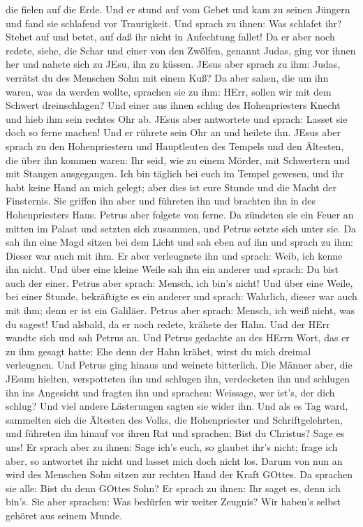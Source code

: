 die fielen auf die Erde.  Und er stund auf vom Gebet und
kam zu seinen Jüngern und fand sie schlafend vor Traurigkeit.
 Und sprach zu ihnen: Was schlafet ihr? Stehet auf und
betet, auf daß ihr nicht in Anfechtung fallet!  Da er aber
noch redete, siehe, die Schar und einer von den Zwölfen, genannt Judas,
ging vor ihnen her und nahete sich zu JEsu, ihn zu küssen. 
JEsus aber sprach zu ihm: Judas, verrätst du des Menschen Sohn mit einem
Kuß?  Da aber sahen, die um ihn waren, was da werden
wollte, sprachen sie zu ihm: HErr, sollen wir mit dem Schwert
dreinschlagen?  Und einer aus ihnen schlug des
Hohenpriesters Knecht und hieb ihm sein rechtes Ohr ab. 
JEsus aber antwortete und sprach: Lasset sie doch so ferne machen! Und
er rührete sein Ohr an und heilete ihn.  JEsus aber sprach
zu den Hohenpriestern und Hauptleuten des Tempels und den Ältesten, die
über ihn kommen waren: Ihr seid, wie zu einem Mörder, mit Schwertern und
mit Stangen ausgegangen.  Ich bin täglich bei euch im
Tempel gewesen, und ihr habt keine Hand an mich gelegt; aber dies ist
eure Stunde und die Macht der Finsternis.  Sie griffen ihn
aber und führeten ihn und brachten ihn in des Hohenpriesters Haus.
Petrus aber folgete von ferne.  Da zündeten sie ein Feuer
an mitten im Palast und setzten sich zusammen, und Petrus setzte sich
unter sie.  Da sah ihn eine Magd sitzen bei dem Licht und
sah eben auf ihn und sprach zu ihm: Dieser war auch mit ihm.
 Er aber verleugnete ihn und sprach: Weib, ich kenne ihn
nicht.  Und über eine kleine Weile sah ihn ein anderer und
sprach: Du bist auch der einer. Petrus aber sprach: Mensch, ich bin's
nicht!  Und über eine Weile, bei einer Stunde, bekräftigte
es ein anderer und sprach: Wahrlich, dieser war auch mit ihm; denn er
ist ein Galiläer.  Petrus aber sprach: Mensch, ich weiß
nicht, was du sagest! Und alsbald, da er noch redete, krähete der Hahn.
 Und der HErr wandte sich und sah Petrus an. Und Petrus
gedachte an des HErrn Wort, das er zu ihm gesagt hatte: Ehe denn der
Hahn krähet, wirst du mich dreimal verleugnen.  Und Petrus
ging hinaus und weinete bitterlich.  Die Männer aber, die
JEsum hielten, verspotteten ihn und schlugen ihn, 
verdecketen ihn und schlugen ihn ins Angesicht und fragten ihn und
sprachen: Weissage, wer ist's, der dich schlug?  Und viel
andere Lästerungen sagten sie wider ihn.  Und als es Tag
ward, sammelten sich die Ältesten des Volks, die Hohenpriester und
Schriftgelehrten, und führeten ihn hinauf vor ihren Rat 
und sprachen: Bist du Christus? Sage es uns! Er sprach aber zu ihnen:
Sage ich's euch, so glaubet ihr's nicht;  frage ich aber,
so antwortet ihr nicht und lasset mich doch nicht los. 
Darum von nun an wird des Menschen Sohn sitzen zur rechten Hand der
Kraft GOttes.  Da sprachen sie alle: Bist du denn GOttes
Sohn? Er sprach zu ihnen: Ihr saget es, denn ich bin's. 
Sie aber sprachen: Was bedürfen wir weiter Zeugnis? Wir haben's selbst
gehöret aus seinem Munde.

